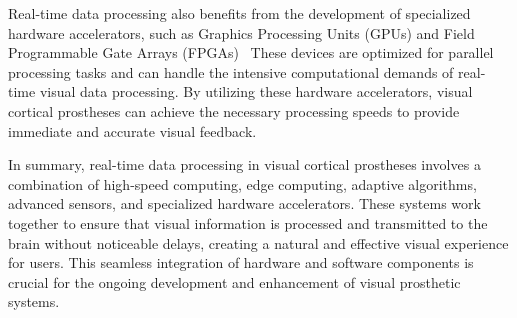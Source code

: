 \documentclass[twocolumn,10pt]{article}
\begin{document}
Real-time data processing also benefits from the development of specialized
hardware accelerators, such as Graphics Processing Units (GPUs) and Field
Programmable Gate Arrays
(FPGAs)~\parencite{springerOnDeviceDeepLearning2021,fengDesignOnlineBrainComputer2020}
These devices are optimized for parallel processing tasks and can handle the
intensive computational demands of real-time visual data processing. By
utilizing these hardware accelerators, visual cortical prostheses can achieve
the necessary processing speeds to provide immediate and accurate visual
feedback.

In summary, real-time data processing in visual cortical prostheses involves a
combination of high-speed computing, edge computing, adaptive algorithms,
advanced sensors, and specialized hardware accelerators. These systems work
together to ensure that visual information is processed and transmitted to the
brain without noticeable delays, creating a natural and effective visual
experience for users. This seamless integration of hardware and software
components is crucial for the ongoing development and enhancement of visual
prosthetic systems.
\end{document}
